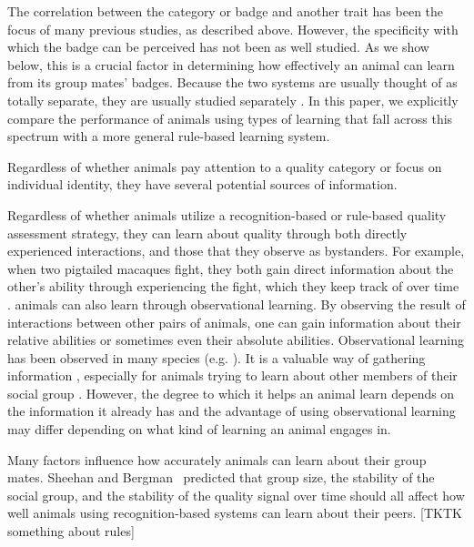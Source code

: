The correlation between the category or badge and another trait has been the focus of many previous studies, as described above. However, the specificity with which the badge can be perceived has not been as well studied. As we show below, this is a crucial factor in determining how effectively an animal can learn from its group mates' badges. Because the two systems are usually thought of as totally separate, they are usually studied separately \citep{sheehan2016evotradeoff}. In this paper, we explicitly compare the performance of animals using types of learning that fall across this spectrum with a more general rule-based learning system.

Regardless of whether animals pay attention to a quality category or focus on individual identity, they have several potential sources of information. 

Regardless of whether animals utilize a recognition-based or rule-based quality assessment strategy, they can learn about quality through both  directly experienced interactions, and those that they observe as bystanders. For example, when two pigtailed macaques fight, they both gain direct information about the other's ability through experiencing the fight, which they keep track of over time \citep{Flack:2006uq}. animals can also learn through observational learning. By observing the result of interactions between other pairs of animals, one can gain information about their relative abilities or sometimes even their absolute abilities. Observational learning has been observed in many species (e.g. \citep{Gaudet:1984cr,Holekamp:1991nx,Fiorito:1992ve,Marchetti:2000dq,Bugnyar:2002qf,Hopper:2008bh,Hobson:2015uq}). It is a valuable way of gathering information \citep{Holekamp:1991nx,Schaik:2011oq,Seyfarth2015SocialCognition}, especially for animals trying to learn about other members of their social group \citep{Freeman:1985kl,Holekamp:1991nx,Hobson:2015uq}. However, the degree to which it helps an animal learn depends on the information it already has and the advantage of using observational learning may differ depending on what kind of learning an animal engages in.


Many factors influence how accurately animals can learn about their group mates. Sheehan and Bergman~\citep{sheehan2016evotradeoff} predicted that group size, the stability of the social group, and the stability of the quality signal over time should all affect how well animals using recognition-based systems can learn about their peers. [TKTK something about rules]

